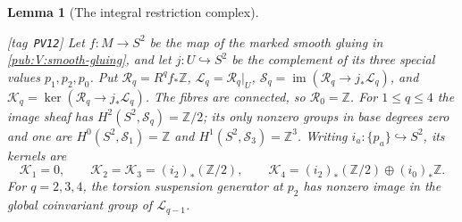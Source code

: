 \documentclass[11pt,a4paper]{article}
\numberwithin{equation}{section}
\newtheorem{lemma}[lemma]{Lemma}
\theoremstyle{definition}
\newcommand{\StatementRecord}[4]{{\upshape\footnotesize[tag~\texttt{#3}]}\enspace\ignorespaces}
\begin{document}
\begin{lemma}[The integral restriction complex]
\hypertarget{tag-PV12}{}\label{pub:V:integral-restrictions}
\StatementRecord{pub:V:integral-restrictions}{proved}{PV12}{\cref{pub:V:smooth-gluing}, \cref{pub:V:rank-six-data}, \cref{night:P1.1}, \cref{night:P1.11}; \cite[Tag 09V5, Lemma 20.18.1]{StacksProject}}
Let $f:M\to S^2$ be the map of the marked smooth gluing in
\cref{pub:V:smooth-gluing}, and let $j:U\hookrightarrow S^2$
be the complement of its three special values $p_1,p_2,p_0$.
Put $\mathcal R_q=R^qf_*\mathbb Z$,
$\mathcal L_q=\mathcal R_q|_U$,
$\mathcal S_q=\operatorname{im}(\mathcal R_q\to j_*\mathcal L_q)$,
and $\mathcal K_q=\ker(\mathcal R_q\to j_*\mathcal L_q)$.
The fibres are connected, so $\mathcal R_0=\mathbb Z$.
For $1\leq q\leq4$ the image sheaf has
$H^2(S^2,\mathcal S_q)=\mathbb Z/2$; its only nonzero groups
in base degrees zero and one are
$H^0(S^2,\mathcal S_1)=\mathbb Z$ and
$H^1(S^2,\mathcal S_3)=\mathbb Z^3$.
Writing $i_a:\{p_a\}\hookrightarrow S^2$, its kernels are
\[
\mathcal K_1=0,\qquad
\mathcal K_2=\mathcal K_3=(i_2)_*(\mathbb Z/2),\qquad
\mathcal K_4=(i_2)_*(\mathbb Z/2)\oplus(i_0)_*\mathbb Z.
\]
For $q=2,3,4$, the torsion suspension generator at $p_2$ has
nonzero image in the global coinvariant group of
$\mathcal L_{q-1}$.
\end{lemma}
\end{document}
